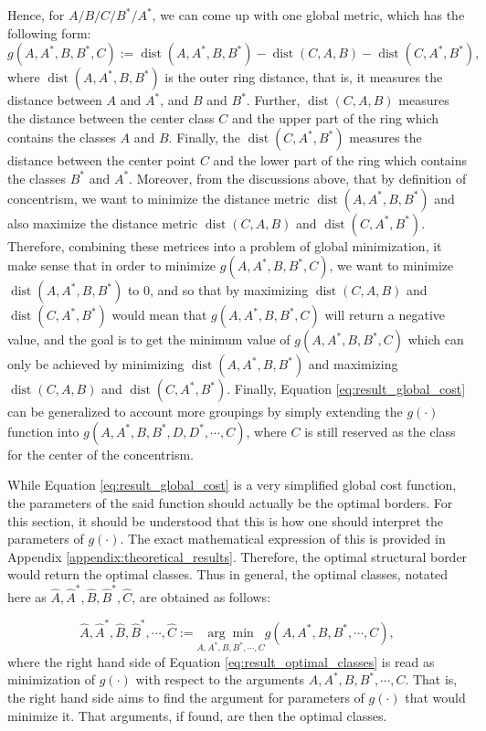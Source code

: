 Hence, for $A/B/C/B^*/A^*$, we can come up with one global metric, which has the following form:
\begin{equation}\label{eq:result_global_cost}
    g(A,A^*,B,B^*,C):=\operatorname{dist}(A,A^*,B,B^*)-\operatorname{dist}(C,A,B) - \operatorname{dist}(C,A^*,B^*),
\end{equation}
where $\operatorname{dist}(A,A^*,B,B^*)$ is the outer ring distance, that is, it measures the distance between $A$ and $A^*$, and $B$ and $B^*$. Further, $\operatorname{dist}(C,A,B)$ measures the distance between the center class $C$ and the upper part of the ring which contains the classes $A$ and $B$. Finally, the $\operatorname{dist}(C,A^*,B^*)$ measures the distance between the center point $C$ and the lower part of the ring which contains the classes $B^*$ and $A^*$. Moreover, from the discussions above, that by definition of concentrism, we want to minimize the distance metric $\operatorname{dist}(A,A^*,B,B^*)$ and also maximize the distance metric $\operatorname{dist}(C,A,B)$ and $\operatorname{dist}(C,A^*,B^*)$. Therefore, combining these metrices into a problem of global minimization, it make sense that in order to minimize $g(A,A^*,B,B^*,C)$, we want to minimize $\operatorname{dist}(A,A^*,B,B^*)$ to 0, and so that by maximizing $\operatorname{dist}(C,A,B)$ and $\operatorname{dist}(C,A^*,B^*)$ would mean that $g(A,A^*,B,B^*,C)$ will return a negative value, and the goal is to get the minimum value of $g(A,A^*,B,B^*,C)$ which can only be achieved by minimizing $\operatorname{dist}(A,A^*,B,B^*)$ and maximizing $\operatorname{dist}(C,A,B)$ and $\operatorname{dist}(C,A^*,B^*)$. Finally, Equation \ref{eq:result_global_cost} can be generalized to account more groupings by simply extending the $g(\cdot)$ function into $g(A,A^*,B,B^*,D,D^*,\cdots, C)$, where $C$ is still reserved as the class for the center of the concentrism.

While Equation \ref{eq:result_global_cost} is a very simplified global cost function, the parameters of the said function should actually be the optimal borders. For this section, it should be understood that this is how one should interpret the parameters of $g(\cdot)$. The exact mathematical expression of this is provided in Appendix \ref{appendix:theoretical_results}. Therefore, the optimal structural border would return the optimal classes. Thus in general, the optimal classes, notated here as $\hat{A},\hat{A}^*,\hat{B},\hat{B}^*,\hat{C}$, are obtained as follows:

\begin{equation}\label{eq:result_optimal_classes}
    \hat{A},\hat{A}^*,\hat{B},\hat{B}^*,\cdots,\hat{C}:=\underset{A,A^{*},B,B^*,\cdots,C}{\arg\min}g(A,A^*,B,B^*,\cdots,C),
\end{equation}
where the right hand side of Equation \ref{eq:result_optimal_classes} is read as minimization of $g(\cdot)$ with respect to the arguments $A,A^*,B,B^*,\cdots,C$. That is, the right hand side aims to find the argument for parameters of $g(\cdot)$ that would minimize it. That arguments, if found, are then the optimal classes.

